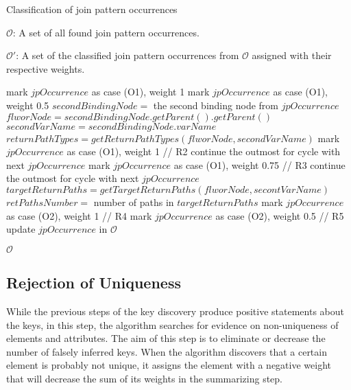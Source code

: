 \begin{algorithm}
\caption{Classification of join pattern occurrences}
\label{ALG_classification_of_join_pattern_occurrences}
\begin{algorithmic}[1]
\REQUIRE $\mathcal{O}$: A set of all found join pattern occurrences.

\ENSURE $\mathcal{O'}$: A set of the classified join pattern occurrences from $\mathcal{O}$ assigned with their respective weights.


        \STATE mark $jpOccurrence$ as case (O1), weight 1
        \STATE mark $jpOccurrence$ as case (O1), weight 0.5
    \ELSE
        \STATE $secondBindingNode =$ the second binding node from $jpOccurrence$
        \STATE $flworNode = secondBindingNode.getParent().getParent()$
        \STATE $secondVarName = secondBindingNode.varName$
        \STATE $returnPathTypes = getReturnPathTypes(flworNode, secondVarName)$
        		\STATE mark $jpOccurrence$ as case (O1), weight 1 // R2
        		\STATE continue the outmost for cycle with next $jpOccurrence$
        	\ENDIF
        \ENDFOR
        		\STATE mark $jpOccurrence$ as case (O1), weight 0.75 // R3
        		\STATE continue the outmost for cycle with next $jpOccurrence$
        	\ENDIF
        \ENDFOR
        \STATE $targetReturnPaths = getTargetReturnPaths(flworNode, secontVarName)$
        \STATE $retPathsNumber = $ number of paths in $targetReturnPaths$
        	\STATE mark $jpOccurrence$ as case (O2), weight 1 // R4
        \ELSE
            \STATE mark $jpOccurrence$ as case (O2), weight 0.5 // R5
        \ENDIF
    \ENDIF
    \STATE update $jpOccurrence$ in $\mathcal{O}$
\ENDFOR

\RETURN $\mathcal{O}$
\end{algorithmic}
\end{algorithm}

\subsection{Rejection of Uniqueness}
While the previous steps of the key discovery produce positive statements about the keys, in this step, the algorithm searches for evidence on non-uniqueness of elements and attributes. The aim of this step is to eliminate or decrease the number of falsely inferred keys.
When the algorithm discovers that a certain element is probably not unique, it assigns the element with a negative weight that will decrease the sum of its weights in the summarizing step.

